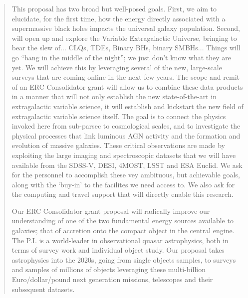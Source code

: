 \documentclass[oneside, a4paper, onecolumn, 11pt]{article}
\begin{document}
\begin{quotation}
{This proposal has two broad but well-posed goals. 
First, we aim to elucidate, for the first time, how the energy directly associated with a 
supermassive black holes impacts the universal galaxy population.  
Second, will open up and explore the Variable Extragalactic Universe, bringing to bear 
the slew of... CLQs, TDEs, Binary BHs, binary SMBHs... 
Things will go ``bang in the middle of the night''; we just don't know what 
they are yet. 
%
%
%
We will achieve this by leveraging 
several of the new, large-scale surveys that are coming online in the next few years. 
The scope and remit of an ERC Consolidator grant will allow us to combine these 
data products in a manner that will 
not only establish the new state-of-the-art in extragalactic variable science, 
{\rm it will establish and kickstart the new field of extragalactic variable science itself}. 
The goal is to connect the physics invoked here
from sub-parsec to cosmological scales, and to investigate the
physical processes that link luminous AGN activity and the formation
and evolution of massive galaxies. These critical observations are
made by exploiting the large imaging and spectroscopic datasets that
we will have available from the 
SDSS-V, DESI,  4MOST, LSST and ESA Euclid. 
We ask for the personnel to accomplish these vey ambituous, 
but achievable goals, along with the `buy-in' to the facilites we need access to. 
We also ask for the computing and travel support that will directly enable this research. 

Our ERC Consolidator grant proposal will radically improve our understanding of 
one of the two fundamental energy sources available to galaxies; that of accretion 
onto the compact object in the central engine. 
The P.I. is a world-leader in observational quasar astrophysics, both in terms of 
survey work and individual object study. 
Our proposal takes astrophysics into the 2020s, going from single objects samples, 
to surveys and samples of millions of objects leveraging these multi-billion Euro/dollar/pound  
next generation missions, telescopes and their subsequent datasets. 
}
\noindent
\end{quotation}
\end{document}
